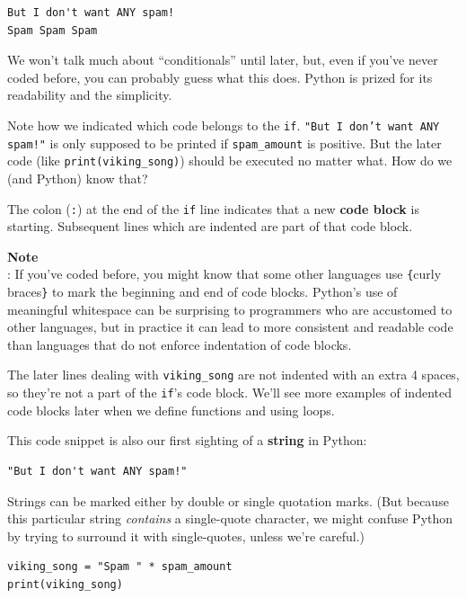 \begin{verbatim}
But I don't want ANY spam!
Spam Spam Spam
\end{verbatim}

We won't talk much about ``conditionals'' until later, but, even if you've never coded before, you can probably guess what this does. Python is prized for its readability and the simplicity.

Note how we indicated which code belongs to the \texttt{if}. \texttt{"But I don't want ANY spam!"} is only supposed to be printed if \texttt{spam\_amount} is positive. But the later code (like \texttt{print(viking\_song)}) should be executed no matter what. How do we (and Python) know that?

The colon (\texttt{:}) at the end of the \texttt{if} line indicates that a new \textbf{code block} is starting. Subsequent lines which are indented are part of that code block.

\begin{framed}
\textbf{Note}\\
: If you've coded before, you might know that some other languages use \texttt{\{}curly braces\texttt{\}} to mark the beginning and end of code blocks. Python's use of meaningful whitespace can be surprising to programmers who are accustomed to other languages, but in practice it can lead to more consistent and readable code than languages that do not enforce indentation of code blocks.
\end{framed}

The later lines dealing with \texttt{viking\_song} are not indented with an extra 4 spaces, so they're not a part of the \texttt{if}'s code block. We'll see more examples of indented code blocks later when we define functions and using loops.

This code snippet is also our first sighting of a \textbf{string} in Python:

\begin{verbatim}
"But I don't want ANY spam!"
\end{verbatim}

Strings can be marked either by double or single quotation marks. (But because this particular string \textit{contains} a single-quote character, we might confuse Python by trying to surround it with single-quotes, unless we're careful.)

\begin{verbatim}
viking_song = "Spam " * spam_amount
print(viking_song)
\end{verbatim}

